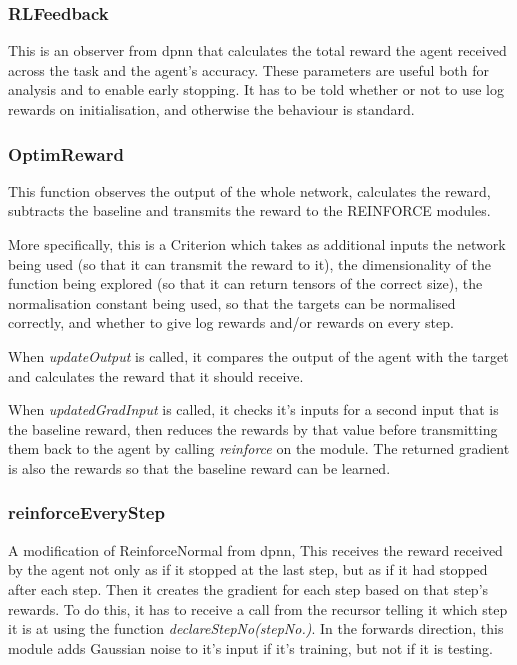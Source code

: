 \subsubsection{RLFeedback}
This is an observer from dpnn that calculates the total reward the agent received across the task and the agent's accuracy. These parameters are useful both for analysis and to enable early stopping. It has to be told whether or not to use log rewards on initialisation, and otherwise the behaviour is standard.

\subsubsection{OptimReward}%
This function observes the output of the whole network, calculates the reward, subtracts the baseline and transmits the reward to the REINFORCE modules.

More specifically, this is a Criterion which takes as additional inputs the network being used (so that it can transmit the reward to it), the dimensionality of the function being explored (so that it can return tensors of the correct size), the normalisation constant being used, so that the targets can be normalised correctly, and whether to give log rewards and/or rewards on every step.

When \emph{updateOutput} is called,  it compares the output of the agent with the target and calculates the reward that it should receive.

When \emph{updatedGradInput} is called, it checks it's inputs for a second input that is the baseline reward, then reduces the rewards by that value before transmitting them back to the agent by calling \emph{reinforce} on the module. The returned gradient is also the rewards so that the baseline reward can be learned.

\subsubsection{reinforceEveryStep}
A modification of ReinforceNormal from dpnn, This receives the reward received by the agent not only as if it stopped at the last step, but as if it had stopped after each step. Then it creates the gradient for each step based on that step's rewards. To do this, it has to receive a call from the recursor telling it which step it is at using the function \emph{declareStepNo(stepNo.)}. In the forwards direction, this module adds Gaussian noise to it's input if it's training, but not if it is testing.


